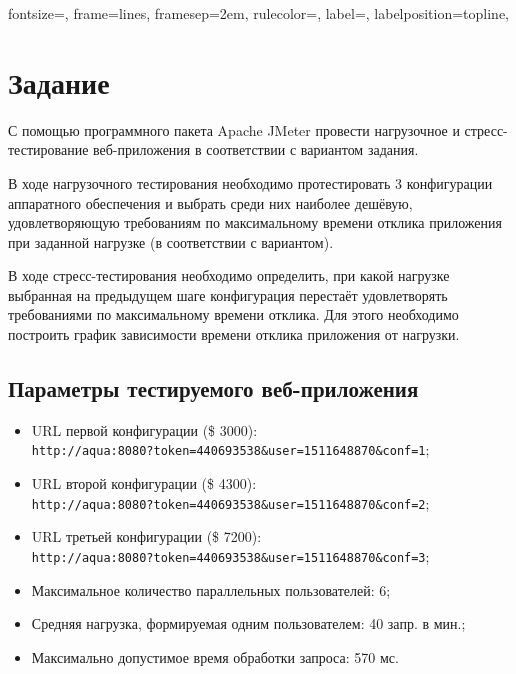
\isonefalse
\def \labnum {4}
\def \labsubj {Тестирование программного обеспечения}
\def \labauthor {Айтуганов Д. А. \\ Чебыкин И. Б.}
\def \labgroup {P3301}
\isinspfalse
\def \labinsp {}

\usepackage{graphicx}
\usepackage{verbatim}
\usepackage[dvipsnames]{xcolor}

\usepackage{fancyvrb}

 {
 fontsize=\scriptsize,
 frame=lines,  %
 framesep=2em, %
 rulecolor=\color{Gray},
 label=,
 labelposition=topline,
}




\section{Задание}
С помощью программного пакета Apache JMeter провести нагрузочное и
стресс-тестирование веб-приложения в соответствии с вариантом задания.

В ходе нагрузочного тестирования необходимо протестировать 3 конфигурации
аппаратного обеспечения и выбрать среди них наиболее дешёвую, удовлетворяющую
требованиям по максимальному времени отклика приложения при заданной нагрузке
(в соответствии с вариантом).

В ходе стресс-тестирования необходимо определить, при какой нагрузке выбранная
на предыдущем шаге конфигурация перестаёт удовлетворять требованиями по
максимальному времени отклика. Для этого необходимо построить график
зависимости времени отклика приложения от нагрузки.

\subsection{Параметры тестируемого веб-приложения}
\begin{itemize}
\item URL первой конфигурации (\$ 3000): \\
\verb|http://aqua:8080?token=440693538&user=1511648870&conf=1|;
\item URL второй конфигурации (\$ 4300): \\
\verb|http://aqua:8080?token=440693538&user=1511648870&conf=2|;
\item URL третьей конфигурации (\$ 7200): \\
\verb|http://aqua:8080?token=440693538&user=1511648870&conf=3|;
\item Максимальное количество параллельных пользователей: 6;
\item Средняя нагрузка, формируемая одним пользователем: 40 запр. в мин.;
\item Максимально допустимое время обработки запроса: 570 мс.
\end{itemize}
